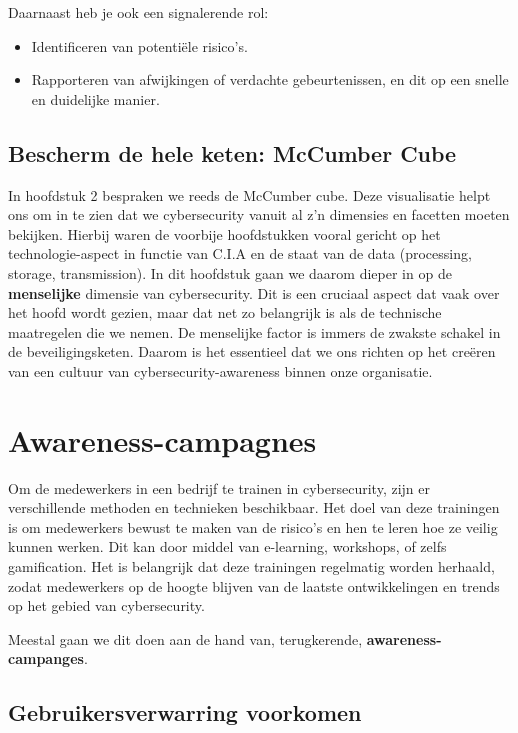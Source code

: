 \documentclass[
  10pt,
  dutch,
  paper=a4,
  ,captions=tableheading
]{scrbook}
\providecommand{\tightlist}{%
  \setlength{\itemsep}{0pt}\setlength{\parskip}{0pt}}
\begin{document}
Daarnaast heb je ook een signalerende rol:

\begin{itemize}
\tightlist
\item
  Identificeren van potentiële risico's.
\item
  Rapporteren van afwijkingen of verdachte gebeurtenissen, en dit op een
  snelle en duidelijke manier.
\end{itemize}

\subsection{Bescherm de hele keten: McCumber
Cube}\label{bescherm-de-hele-keten-mccumber-cube}

In hoofdstuk 2 bespraken we reeds de McCumber cube. Deze visualisatie
helpt ons om in te zien dat we cybersecurity vanuit al z'n dimensies en
facetten moeten bekijken. Hierbij waren de voorbije hoofdstukken vooral
gericht op het technologie-aspect in functie van C.I.A en de staat van
de data (processing, storage, transmission). In dit hoofdstuk gaan we
daarom dieper in op de \textbf{menselijke} dimensie van cybersecurity.
Dit is een cruciaal aspect dat vaak over het hoofd wordt gezien, maar
dat net zo belangrijk is als de technische maatregelen die we nemen. De
menselijke factor is immers de zwakste schakel in de beveiligingsketen.
Daarom is het essentieel dat we ons richten op het creëren van een
cultuur van cybersecurity-awareness binnen onze organisatie.

\section{Awareness-campagnes}\label{awareness-campagnes}

Om de medewerkers in een bedrijf te trainen in cybersecurity, zijn er
verschillende methoden en technieken beschikbaar. Het doel van deze
trainingen is om medewerkers bewust te maken van de risico's en hen te
leren hoe ze veilig kunnen werken. Dit kan door middel van e-learning,
workshops, of zelfs gamification. Het is belangrijk dat deze trainingen
regelmatig worden herhaald, zodat medewerkers op de hoogte blijven van
de laatste ontwikkelingen en trends op het gebied van cybersecurity.

Meestal gaan we dit doen aan de hand van, terugkerende,
\textbf{awareness-campanges}.

\subsection{Gebruikersverwarring
voorkomen}\label{gebruikersverwarring-voorkomen}
\end{document}
